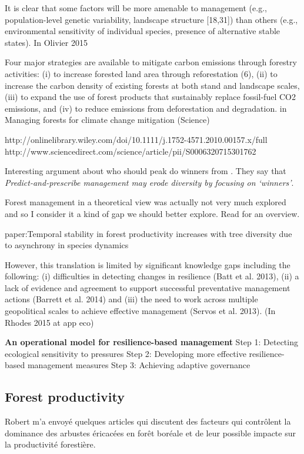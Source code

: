 It is clear that some factors will be more amenable to management (e.g., population-level genetic variability, landscape structure
[18,31]) than others (e.g., environmental sensitivity of individual species, presence of alternative stable states). In Olivier 2015

Four major strategies are available to mitigate carbon emissions through forestry activities: (i) to increase forested land area through reforestation (6), (ii) to increase the carbon density of existing forests at both stand and landscape scales, (iii) to expand the use of forest products that sustainably replace fossil-fuel CO2 emissions, and (iv) to reduce emissions from deforestation and degradation. in Managing forests for climate change mitigation (Science)

http://onlinelibrary.wiley.com/doi/10.1111/j.1752-4571.2010.00157.x/full \\
http://www.sciencedirect.com/science/article/pii/S0006320715301762

Interesting argument about who should peak do winners from \citet{Webster2017}. They say that \textit{Predict-and-prescribe management may erode diversity by focusing on ‘winners’}.

Forest management in a theoretical view was actually not very much explored and so I consider it a kind of gap we should better explore. Read \citet{Becknell2015} for an overview.

paper:Temporal stability in forest productivity increases with tree diversity due to asynchrony in species dynamics

However, this translation is limited by significant knowledge gaps including the following: (i) difficulties in detecting changes in resilience (Batt et al. 2013), (ii) a lack of evidence and agreement to support successful preventative management actions (Barrett et al. 2014) and (iii) the need to work across multiple geopolitical scales to achieve effective management (Servos et al. 2013). (In Rhodes 2015 at app eco)

\textbf{An operational model for resilience-based management}
Step 1: Detecting ecological sensitivity to pressures
Step 2: Developing more effective resilience-based management measures
Step 3: Achieving adaptive governance

\subsection{Forest productivity}
Robert m'a envoyé quelques articles qui discutent des facteurs qui contrôlent la dominance des arbustes éricacées en forêt boréale et de leur possible impacte sur la productivité forestière.

